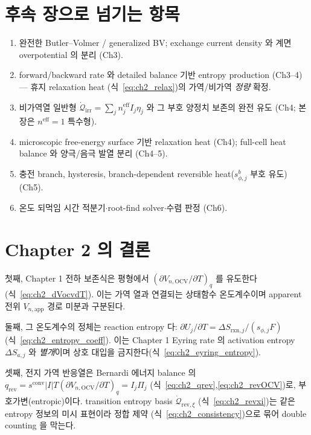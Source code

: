 \documentclass[11pt,a4paper]{article}
\newcommand{\eff}{\mathrm{eff}}
\newcommand{\app}{\mathrm{app}}
\newcommand{\OCV}{\mathrm{OCV}}
\newcommand{\irr}{\mathrm{irr}}
\newcommand{\rev}{\mathrm{rev}}
\newcommand{\rxn}{\mathrm{rxn}}
\newcommand{\conv}{\mathrm{conv}}
\begin{document}
\section{후속 장으로 넘기는 항목}\label{sec:ch2_transmit}
\begin{enumerate}[label=\arabic*),leftmargin=2.0em]
\item 완전한 Butler--Volmer / generalized BV; exchange current density 와 계면 overpotential 의 분리 (Ch3).
\item forward/backward rate 와 detailed balance 기반 entropy production (Ch3--4) — 휴지 relaxation heat
  (식~\eqref{eq:ch2_relax})의 가역/비가역 \emph{정량} 확정.
\item 비가역열 일반형 $\dot{\mathcal Q}_{\irr}=\sum_j n_j^{\eff}I_j\eta_j$ 와 그 부호 양정치 보존의 완전 유도
  (Ch4; 본 장은 $n^\eff=1$ 특수형).
\item microscopic free-energy surface 기반 relaxation heat (Ch4); full-cell heat balance 와 양극/음극 발열
  분리 (Ch4--5).
\item 충전 branch, hysteresis, branch-dependent reversible heat($s_{\phi,j}^b$ 부호 유도) (Ch5).
\item 온도 되먹임 시간 적분기$\cdot$root-find solver$\cdot$수렴 판정 (Ch6).
\end{enumerate}

\section{Chapter 2 의 결론}\label{sec:ch2_concl}
첫째, Chapter 1 전하 보존식은 평형에서 $(\partial V_{n,\OCV}/\partial T)_q$ 를 유도한다(식~\eqref{eq:ch2_dVocvdT}).
이는 가역 열과 연결되는 상태함수 온도계수이며 apparent 전위 $V_{n,\app}$ 경로 미분과 구분된다.

둘째, 그 온도계수의 정체는 reaction entropy 다: $\partial U_j/\partial T=\Delta S_{\rxn,j}/(s_{\phi,j}F)$
(식~\eqref{eq:ch2_entropy_coeff}). 이는 Chapter 1 Eyring rate 의 activation entropy $\Delta S_{a,j}$ 와
\emph{별개}이며 상호 대입을 금지한다(식~\eqref{eq:ch2_eyring_entropy}).

셋째, 전지 가역 반응열은 Bernardi 에너지 balance 의 $q_\rev=s^{\conv}|I|T(\partial V_{n,\OCV}/\partial T)_q
=I_j\Pi_j$ (식~\eqref{eq:ch2_qrev},\eqref{eq:ch2_revOCV})로, 부호가변(entropic)이다. transition entropy basis
$\dot{\mathcal Q}_{\rev,\xi}$ (식~\eqref{eq:ch2_revxi})는 같은 entropy 정보의 미시 표현이라 정합 제약
(식~\eqref{eq:ch2_consistency})으로 묶어 double counting 을 막는다.
\end{document}
